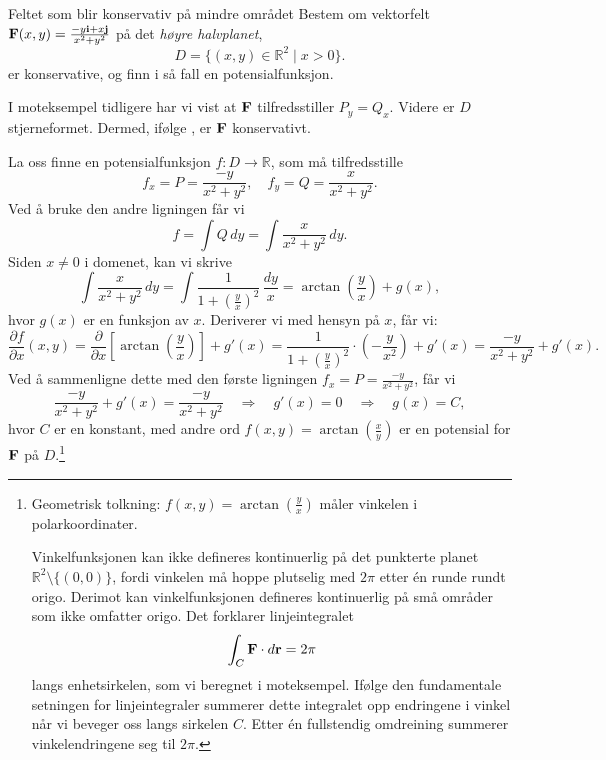 \begin{eks}{Feltet som blir konservativ på mindre området}
Bestem om vektorfelt $\mathbf{F}(x,y) = \frac{-y\mathbf{i}+x\mathbf{j}}{x^2+y^2}$ på det \textit{høyre halvplanet},
\[
D = \{(x, y) \in \mathbb{R}^2 \mid x > 0\}.
\] er konservative, og finn i så fall en potensialfunksjon.

I moteksempel tidligere har vi vist at $\mathbf{F}$ tilfredsstiller $P_y = Q_x$. Videre er $D$ stjerneformet. Dermed, ifølge , er $\mathbf{F}$ konservativt.

La oss finne en potensialfunksjon $f \colon D \to \mathbb{R}$, som må tilfredsstille
\[
f_x = P = \frac{-y}{x^2 + y^2}, \quad f_y = Q = \frac{x}{x^2 + y^2}.
\]
Ved å bruke den andre ligningen får vi
\[
f = \int Q\, dy = \int \frac{x}{x^2 + y^2}\, dy.
\]
Siden $x \ne 0$ i domenet, kan vi skrive
\[
\int \frac{x}{x^2 + y^2}\, dy = \int \frac{1}{1 + \left(\frac{y}{x}\right)^2} \, \frac{dy}{x} = \arctan\left(\frac{y}{x}\right) + g(x),
\]
hvor $g(x)$ er en funksjon av $x$. Deriverer vi med hensyn på $x$, får vi:
\[
\frac{\partial f}{\partial x}(x,y) = \frac{\partial}{\partial x} \left[\arctan\left(\frac{y}{x}\right)\right] + g'(x) 
= \frac{1}{1 + \left(\frac{y}{x}\right)^2} \cdot \left(-\frac{y}{x^2}\right) + g'(x) 
= \frac{-y}{x^2 + y^2} + g'(x).
\]
Ved å sammenligne dette med den første ligningen $f_x = P = \frac{-y}{x^2 + y^2}$, får vi
\[
\frac{-y}{x^2 + y^2} + g'(x) = \frac{-y}{x^2 + y^2} \quad \Rightarrow \quad g'(x) = 0 \quad \Rightarrow \quad g(x) = C,
\]
hvor $C$ er en konstant, med andre ord $f(x,y)=\arctan (\tfrac{x}{y})$ er en potensial for $\mathbf{F}$ på $D$.\footnote{Geometrisk tolkning: $f(x, y) = \arctan\left(\frac{y}{x}\right)$ måler vinkelen i polarkoordinater. 

Vinkelfunksjonen kan ikke defineres kontinuerlig på det punkterte planet $\mathbb{R}^2 \setminus \{(0, 0)\}$, fordi vinkelen må hoppe plutselig med $2\pi$ etter én runde rundt origo. Derimot kan vinkelfunksjonen defineres kontinuerlig på små områder som ikke omfatter origo. Det forklarer linjeintegralet 
\[
\int_C \mathbf{F} \cdot d\mathbf{r} = 2\pi
\]
langs enhetsirkelen, som vi beregnet i moteksempel. Ifølge den fundamentale setningen for linjeintegraler summerer dette integralet opp endringene i vinkel når vi beveger oss langs sirkelen $C$. Etter én fullstendig omdreining summerer vinkelendringene seg til $2\pi$.}
\end{eks}

